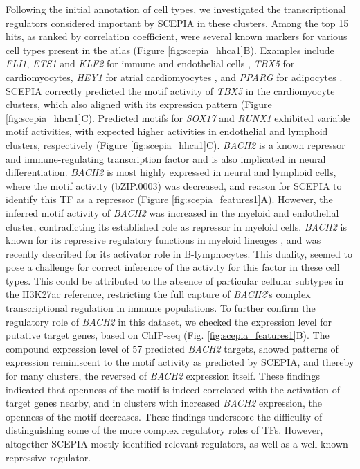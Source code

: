 Following the initial annotation of cell types, we investigated the transcriptional regulators considered important by SCEPIA in these clusters. Among the top 15 hits, as ranked by correlation coefficient, were several known markers for various cell types present in the atlas (Figure \ref{fig:scepia_hhca1}B). Examples include \textit{FLI1}, \textit{ETS1} and \textit{KLF2} for immune and endothelial cells \cite{Meadows2009,Zhao2018,BenDavid2022}, \textit{TBX5} for cardiomyocytes\cite{Steimle2017,Siatra2023}, \textit{HEY1} for atrial cardiomyocytes \cite{Kokubo2007}, and \textit{PPARG} for adipocytes \cite{Ma2018}. SCEPIA correctly predicted the motif activity of \textit{TBX5} in the cardiomyocyte clusters, which also aligned with its expression pattern (Figure \ref{fig:scepia_hhca1}C). Predicted motifs for \textit{SOX17} and \textit{RUNX1} exhibited variable motif activities, with expected higher activities in endothelial and lymphoid clusters, respectively (Figure \ref{fig:scepia_hhca1}C)\cite{Lee2014,Schachterle2017,Sood2017}. \textit{BACH2} is a known repressor and immune-regulating transcription factor and is also implicated in neural differentiation\cite{Hoshino2002,Liu2022}. \textit{BACH2} is most highly expressed in neural and lymphoid cells, where the motif activity (bZIP.0003) was decreased, and reason for SCEPIA to identify this TF as a repressor (Figure \ref{fig:scepia_features1}A). However, the inferred motif activity of \textit{BACH2} was increased in the myeloid and endothelial cluster, contradicting its established role as repressor in myeloid cells. \textit{BACH2} is known for its repressive regulatory functions in myeloid lineages \cite{ItohNakadai2014}, and was recently described for its activator role in B-lymphocytes\cite{Ochiai2022}. This duality, seemed to pose a challenge for  correct inference of the activity for this factor in these cell types. This could be attributed to the absence of particular cellular subtypes in the H3K27ac reference, restricting the full capture of \textit{BACH2}'s complex  transcriptional regulation in immune populations. To further confirm the regulatory role of \textit{BACH2} in this dataset, we checked the expression level for putative target genes, based on ChIP-seq (Fig. \ref{fig:scepia_features1}B). The compound expression level of 57 predicted \textit{BACH2} targets, showed patterns of expression reminiscent to the motif activity as predicted by SCEPIA, and thereby for many clusters, the reversed of \textit{BACH2} expression itself. These findings indicated that openness of the motif is indeed correlated with the activation of target genes nearby, and in clusters with increased \textit{BACH2} expression, the openness of the motif decreases. These findings underscore the difficulty of distinguishing some of the more complex regulatory roles of TFs. However, altogether SCEPIA mostly identified relevant regulators, as well as a well-known repressive regulator.

